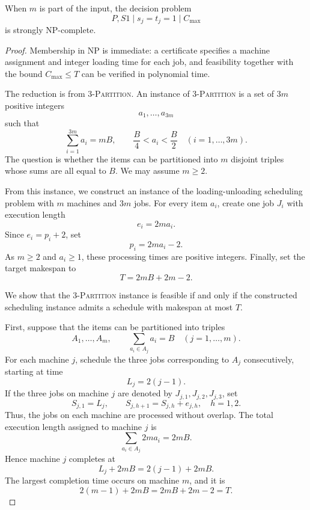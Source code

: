 \documentclass[10pt,a4paper]{amsart}
\begin{document}
\begin{theorem}
\label{thm:variable-m-strongly-np-complete}
When \(m\) is part of the input, the decision problem
\[
        P,S1\mid s_j=t_j=1\mid C_{\max}
\]
is strongly NP-complete.
\end{theorem}

\begin{proof}
Membership in NP is immediate: a certificate specifies a machine assignment and
integer loading time for each job, and feasibility together with the bound
\(C_{\max}\le T\) can be verified in polynomial time.


The reduction is from \textsc{3-Partition}. An instance of \textsc{3-Partition} is a
set of \(3m\) positive integers
\[
        a_1,\ldots,a_{3m}
\]
such that
\[
        \sum_{i=1}^{3m}a_i=mB,
        \qquad
        \frac{B}{4}<a_i<\frac{B}{2}
        \quad (i=1,\ldots,3m).
\]
The question is whether the items can be partitioned into \(m\) disjoint triples
whose sums are all equal to \(B\). We may assume \(m\ge2\).

From this instance, we construct an instance of the loading-unloading scheduling
problem with \(m\) machines and \(3m\) jobs. For every item \(a_i\), create one
job \(J_i\) with execution length
\[
        e_i=2m a_i .
\]
Since \(e_i=p_i+2\), set
\[
        p_i=2m a_i-2 .
\]
As \(m\ge2\) and \(a_i\ge1\), these processing times are positive integers.
Finally, set the target makespan to
\[
        T=2mB+2m-2 .
\]

We show that the \textsc{3-Partition} instance is feasible if and only if the
constructed scheduling instance admits a schedule with makespan at most \(T\).

First, suppose that the items can be partitioned into triples
\[
        A_1,\ldots,A_m,
        \qquad
        \sum_{a_i\in A_j}a_i=B
        \quad (j=1,\ldots,m).
\]
For each machine \(j\), schedule the three jobs corresponding to \(A_j\)
consecutively, starting at time
\[
        L_j=2(j-1).
\]
If the three jobs on machine \(j\) are denoted by
\(J_{j,1},J_{j,2},J_{j,3}\), set
\[
        S_{j,1}=L_j,
        \qquad
        S_{j,h+1}=S_{j,h}+e_{j,h},
        \quad h=1,2.
\]
Thus, the jobs on each machine are processed without overlap. The total execution
length assigned to machine \(j\) is
\[
        \sum_{a_i\in A_j}2m a_i=2mB.
\]
Hence machine \(j\) completes at
\[
        L_j+2mB=2(j-1)+2mB.
\]
The largest completion time occurs on machine \(m\), and it is
\[
        2(m-1)+2mB=2mB+2m-2=T.
\]


\end{proof}
\end{document}
